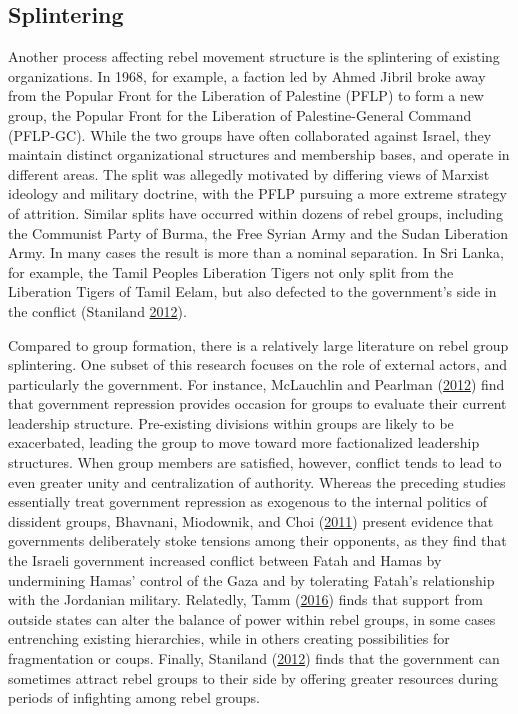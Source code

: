 \documentclass[12pt,]{book}
\theoremstyle{definition}
\theoremstyle{definition}
\theoremstyle{definition}
\theoremstyle{remark}
\begin{document}
\hypertarget{splintering}{%
\subsection{Splintering}\label{splintering}}

Another process affecting rebel movement structure is the splintering of
existing organizations. In 1968, for example, a faction led by Ahmed
Jibril broke away from the Popular Front for the Liberation of Palestine
(PFLP) to form a new group, the Popular Front for the Liberation of
Palestine-General Command (PFLP-GC). While the two groups have often
collaborated against Israel, they maintain distinct organizational
structures and membership bases, and operate in different areas. The
split was allegedly motivated by differing views of Marxist ideology and
military doctrine, with the PFLP pursuing a more extreme strategy of
attrition. Similar splits have occurred within dozens of rebel groups,
including the Communist Party of Burma, the Free Syrian Army and the
Sudan Liberation Army. In many cases the result is more than a nominal
separation. In Sri Lanka, for example, the Tamil Peoples Liberation
Tigers not only split from the Liberation Tigers of Tamil Eelam, but
also defected to the government's side in the conflict (Staniland
\protect\hyperlink{ref-Staniland2012d}{2012}).

Compared to group formation, there is a relatively large literature on
rebel group splintering. One subset of this research focuses on the role
of external actors, and particularly the government. For instance,
McLauchlin and Pearlman (\protect\hyperlink{ref-McLauchlin2012}{2012})
find that government repression provides occasion for groups to evaluate
their current leadership structure. Pre-existing divisions within groups
are likely to be exacerbated, leading the group to move toward more
factionalized leadership structures. When group members are satisfied,
however, conflict tends to lead to even greater unity and centralization
of authority. Whereas the preceding studies essentially treat government
repression as exogenous to the internal politics of dissident groups,
Bhavnani, Miodownik, and Choi
(\protect\hyperlink{ref-Bhavnani2011}{2011}) present evidence that
governments deliberately stoke tensions among their opponents, as they
find that the Israeli government increased conflict between Fatah and
Hamas by undermining Hamas' control of the Gaza and by tolerating
Fatah's relationship with the Jordanian military. Relatedly, Tamm
(\protect\hyperlink{ref-Tamm2016}{2016}) finds that support from outside
states can alter the balance of power within rebel groups, in some cases
entrenching existing hierarchies, while in others creating possibilities
for fragmentation or coups. Finally, Staniland
(\protect\hyperlink{ref-Staniland2012d}{2012}) finds that the government
can sometimes attract rebel groups to their side by offering greater
resources during periods of infighting among rebel groups.
\end{document}
